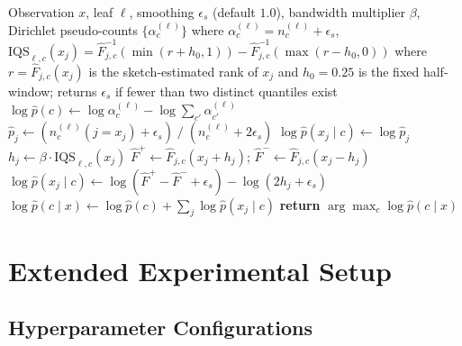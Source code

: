 \documentclass{article}
\newcommand{\mist}{\textsc{Mist}}
\begin{document}
\begin{algorithm}[h]
\caption{\mist{}-K: Sketch-Based Leaf Likelihood}
\label{alg:mistk}
\begin{algorithmic}[1]
\REQUIRE Observation $x$, leaf $\ell$, smoothing $\epsilon_s$ (default $1.0$),
         bandwidth multiplier $\beta$,
         Dirichlet pseudo-counts $\{\alpha_c^{(\ell)}\}$ where
         $\alpha_c^{(\ell)} = n_c^{(\ell)} + \epsilon_s$,\\
         $\mathrm{IQS}_{\ell,c}(x_j) = \widehat{F}_{j,c}^{-1}(\min(r+h_0,1))
         - \widehat{F}_{j,c}^{-1}(\max(r-h_0,0))$
         where $r = \widehat{F}_{j,c}(x_j)$ is the sketch-estimated rank
         of $x_j$ and $h_0=0.25$ is the fixed half-window;
         returns $\epsilon_s$ if fewer than two distinct quantiles exist
  \STATE $\log\hat{p}(c) \leftarrow \log\alpha_c^{(\ell)} -
         \log\sum_{c'}\alpha_{c'}^{(\ell)}$
      \STATE $\hat{p}_j \leftarrow (n_c^{(\ell)}(j{=}x_j) + \epsilon_s)\;/\;
             (n_c^{(\ell)} + 2\epsilon_s)$
      \STATE $\log\hat{p}(x_j \mid c) \leftarrow \log\hat{p}_j$
    \ELSE
      \STATE $h_j \leftarrow \beta \cdot \mathrm{IQS}_{\ell,c}(x_j)$
      \STATE $\hat{F}^+ \leftarrow \widehat{F}_{j,c}(x_j + h_j)$;\quad
             $\hat{F}^- \leftarrow \widehat{F}_{j,c}(x_j - h_j)$
      \STATE $\log\hat{p}(x_j \mid c) \leftarrow
             \log(\hat{F}^+ - \hat{F}^- + \epsilon_s) -
             \log(2h_j + \epsilon_s)$
    \ENDIF
  \ENDFOR
  \STATE $\log\hat{p}(c \mid x) \leftarrow \log\hat{p}(c) +
         \sum_j \log\hat{p}(x_j \mid c)$
\ENDFOR
\STATE \textbf{return} $\arg\max_c \log\hat{p}(c \mid x)$
\end{algorithmic}
\end{algorithm}


\section{Extended Experimental Setup}
\label{app:setup}

\subsection{Hyperparameter Configurations}
\label{app:hyperparams}
\end{document}
